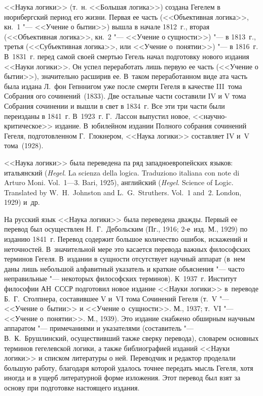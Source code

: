 <<Наука логики>> (т.~н. <<Большая логика>>) создана Гегелем в нюрнбергский
период его жизни. Первая ее часть (<<Объективная логика>>, кн.~1 "--- <<Учение
о бытии>>) вышла в начале 1812~г., вторая (<<Объективная логика>>, кн.~2 "---
<<Учение о сущности>>) "--- в 1813~г., третья (<<Субъективная логика>>, или
<<Учение о~понятии>>) "--- в 1816~г. В~1831~г. перед самой своей смертью Гегель
начал подготовку нового издания <<Науки логики>>. Он успел переработать лишь
первую ее часть (<<Учение о бытии>>), значительно расширив ее. В~таком
переработанном виде ата часть была издана Л.~фон Гепннигом уже после смерти
Гегеля в качестве III~тома Собрания ого сочинений~(1833). Две остальные части
составили IV и V тома Собрания сочинении и вышли в свет в 1834~г. Все эти три
части были переизданы в 1841~г. В~1923~г. Г.~Лассон выпустил новое,
<<научно-критическое>> издание. В~юбилейном издании Полного собрания сочинений
Гегеля, подготовленном Г.~Глокнером, <<Наука логики>>
составляет IV и~V тома~(1928).

<<Наука логики>> была переведена па ряд западноевропейских языков: итальянский
({\em Hegel}. La scienza della logica. Traduziono italiana con note di Arturo
Moni. Vol.~1---3. Bari, 1925), английский ({\em Hegel}. Science of Logic.
Translated by W.~H.~Johnston and L.~G.~Struthers. Vol.~1 and~2. London, 1929)
и~др.

На русский язык <<Наука логики>> была переведена дважды. Первый ее перевод был
осуществлен Н.~Г.~Дебольским (Пг., 1916; 2-е~изд. М., 1929) по изданию 1841~г.
Перевод содержит большое количество ошибок, искажений и неточностей.
В~значительной мере это касается перевода важных философских терминов Гегеля.
В~издании в сущности отсутствует научный аппарат (в~нем даны лишь небольшой
алфавитный указатель и краткие объяснения "--- часто неправильные "---
некоторых философских терминов). К~1937~г. Институт философии АН~СССР
подготовил новое издание <<Науки логики>> в~переводе Б.~Г.~Столпнера,
составившее V и~VI тома Сочинений Гегеля (т.~V "--- <<Учение о~бытии>> и
<<Учение о~сущности>>. М., 1937; т.~VI "--- <<Учение о~понятии>>. М., 1939).
Это издание снабжено обширным научным аппаратом "--- примечаниями и указателями
(составитель "--- В.~К.~Брушлинский, осуществивший также сверку перевода),
словарем основных терминов гегелевской логики, а также библиографией изданий
<<Науки логики>> и списком литературы о ней. Переводчик и редактор проделали
большую работу, благодаря которой удалось точнее передать мысль Гегеля, хотя
иногда и в ущерб литературной форме изложения. Этот перевод был взят за основу
при подготовке настоящего издания.

\bigskip

\begin{center}
~~~~~~
\end{center}

\bigskip

\printpagenotes
